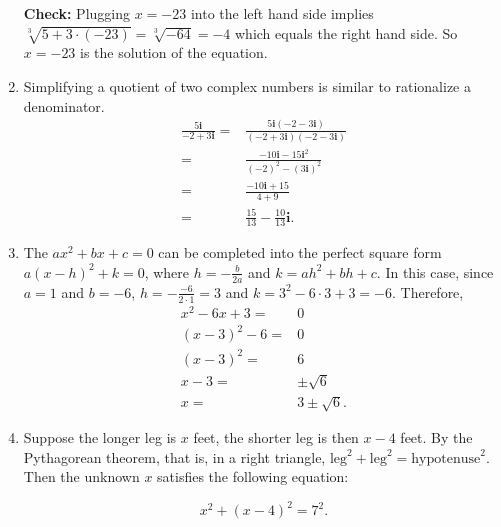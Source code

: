 \documentclass[
  12pt]{article}
\begin{document}
\begin{enumerate}
  \textbf{Check:} Plugging \(x=-23\) into the left hand side implies
  \(\sqrt[3]{5+3\cdot(-23)}=\sqrt[3]{-64}=-4\) which equals the right
  hand side. So \(x=-23\) is the solution of the equation.
\item
  Simplifying a quotient of two complex numbers is similar to
  rationalize a denominator. \[
  \begin{aligned}
  \frac{5\mathbf{i}}{-2+3\mathbf{i}}=&\frac{5\mathbf{i}(-2-3\mathbf{i})}{(-2+3\mathbf{i})(-2-3\mathbf{i})}\\
  =&\frac{-10\mathbf{i}-15\mathbf{i}^2}{(-2)^2-(3\mathbf{i})^2}\\
  =&\frac{-10\mathbf{i}+15}{4+9}\\
  =&\frac{15}{13}-\frac{10}{13}\mathbf{i}.
  \end{aligned}
  \]
\item
  The \(ax^2+bx+c=0\) can be completed into the perfect square form
  \(a(x-h)^2+k=0\), where \(h=-\frac{b}{2a}\) and \(k=ah^2+bh+c\). In
  this case, since \(a=1\) and \(b=-6\), \(h=-\frac{-6}{2\cdot 1}=3\)
  and \(k=3^2-6\cdot 3+3=-6\). Therefore, \[
  \begin{aligned}
  x^2-6x+3=&0\\
  (x-3)^2-6=&0\\
  (x-3)^2=&6\\
  x-3=&\pm\sqrt{6}\\
  x=&3\pm\sqrt{6}.
  \end{aligned}
  \]
\item
  Suppose the longer leg is \(x\) feet, the shorter leg is then \(x-4\)
  feet. By the Pythagorean theorem, that is, in a right triangle,
  \(\text{leg}^2+\text{leg}^2=\text{hypotenuse}^2\). Then the unknown
  \(x\) satisfies the following equation:

  \[x^2+(x-4)^2=7^2.\]


\end{enumerate}
\end{document}
